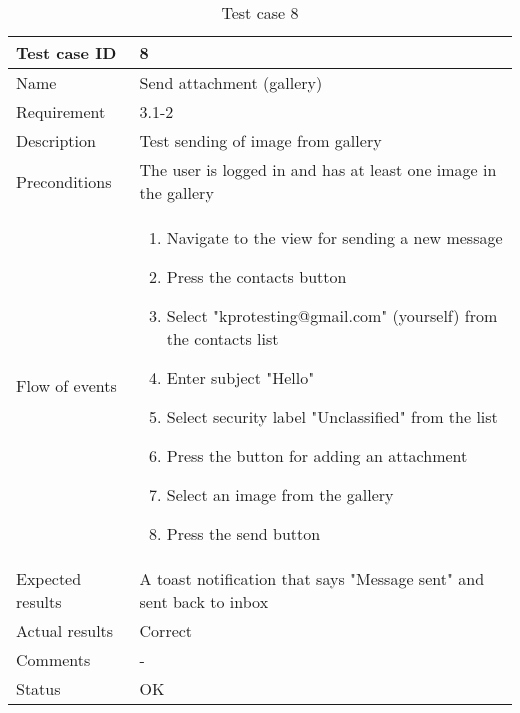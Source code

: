 		\begin{table}[htb]
			\begin{tabular}{l|p{10cm}}
				Test case ID & 8 \\ \hline
				Name & Send attachment (gallery)\\ \hline
				Requirement & 3.1-2\\ \hline
				Description & Test sending of image from gallery\\ \hline
				Preconditions & The user is logged in and has at least one image in the gallery\\ \hline
				Flow of events & 
					\begin{enumerate}
						\item{}Navigate to the view for sending a new message
						\item{}Press the contacts button
						\item{}Select "kprotesting@gmail.com" (yourself) from the contacts list
						\item{}Enter subject "Hello"
						\item{}Select security label "Unclassified" from the list
						\item{}Press the button for adding an attachment
						\item{}Select an image from the gallery
						\item{}Press the send button
					\end{enumerate} \\ \hline
				Expected results & A toast notification that says "Message sent" and sent back to inbox\\ \hline
				Actual results & Correct\\ \hline
				Comments & -\\ \hline
				Status &OK \\ \hline
			\end{tabular}
			\caption{Test case 8} \label{tab:case8}
		\end{table}

